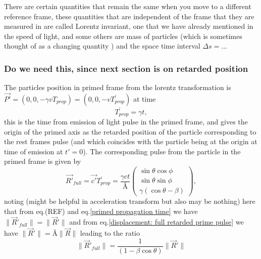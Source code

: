 There are certain quantities that remain the same when you move to a different reference frame, these quantities that are independent of the frame that they are measured in are called Lorentz invariant, one that we have already mentioned in the speed of light, and some others are mass of particles (which is sometimes thought of as a changing quantity ) and the space time interval $\Delta s =...$

\subsubsection{Do we need this, since next section is on retarded position}
The particles position in primed frame from the lorentz transformation is $\Vec{P'} = (0,0,-\gamma v T_{prop}) = (0,0,-v T^{'}_{prop})$ at time
\begin{equation}%
\label{primed propagation time}
    T^{'}_{prop} = \gamma t,
\end{equation}%
this is the time from emission of light pulse in the primed frame, and gives the origin of the primed axis as the retarded position of the particle corresponding to the rest frames pulse (and which coincides with the particle being at the origin at time of emission at $t'=0$). The corresponding pulse from the particle in the primed frame is given by \begin{equation}%
\label{displacement: full retarded prime pulse}
    \Vec{R'}_{full} = \Vec{c'}T^{'}_{prop} =  \dfrac{\gamma ct}{\text{\AA}}  \begin{pmatrix}
     \sin\theta\cos\phi\\  \sin\theta\sin\phi\\ \gamma\left(  \cos\theta - \beta \right)
    \end{pmatrix},
\end{equation}%
noting (might be helpful in acceleration transform but also may be nothing) here that from eq.(REF) and eq.\eqref{primed propagation time} we have $\|\vec{R}'_{full}\|=\|\vec{R}'\|$ and from eq.\eqref{displacement: full retarded prime pulse} we have $\|\vec{R}'\|=\text{\AA}\|\vec{R}\|$ leading to the ratio
\begin{equation}%
    \|\vec{R}'_{full}\| = \dfrac{1}{\left(1 - \beta\cos{\theta}\right)} \|\vec{R}'\|
\end{equation}%

